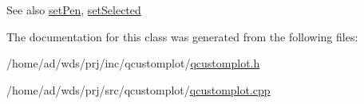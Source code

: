 \begin{DoxySeeAlso}{See also}
\hyperlink{class_q_c_p_item_pixmap_acdade1305edb4b5cae14f97fd132065f}{set\+Pen}, \hyperlink{class_q_c_p_abstract_item_a203de94ad586cc44d16c9565f49d3378}{set\+Selected} 
\end{DoxySeeAlso}


The documentation for this class was generated from the following files\+:\begin{DoxyCompactItemize}
\item 
/home/ad/wds/prj/inc/qcustomplot/\hyperlink{qcustomplot_8h}{qcustomplot.\+h}\item 
/home/ad/wds/prj/src/qcustomplot/\hyperlink{qcustomplot_8cpp}{qcustomplot.\+cpp}\end{DoxyCompactItemize}
